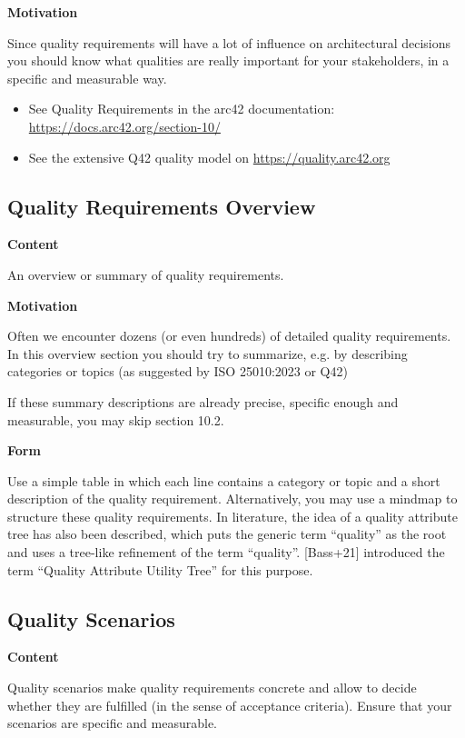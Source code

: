 \documentclass[12pt,a4paper]{article}
\newcommand{\minititle}[1]{%
  \par\addvspace{0.6\baselineskip}%
  \noindent\textbf{#1}\par\nobreak%
  \noindent\ignorespaces%
}
\begin{document}
\minititle{Motivation}
Since quality requirements will have a lot of influence on architectural decisions you should know what qualities are really important for your stakeholders, in a specific and measurable way.

\begin{itemize}
  \item See Quality Requirements in the arc42 documentation:
  \href{https://docs.arc42.org/section-10/}{https://docs.arc42.org/section-10/}
  \item See the extensive Q42 quality model on \href{https://quality.arc42.org/}{https://quality.arc42.org}
\end{itemize}


\subsection{Quality Requirements Overview}

\minititle{Content}
An overview or summary of quality requirements.

\minititle{Motivation}
Often we encounter dozens (or even hundreds) of detailed quality requirements. In this overview section you should try to summarize, e.g. by describing categories or topics (as suggested by ISO 25010:2023 or Q42)

If these summary descriptions are already precise, specific enough and measurable, you may skip section 10.2.

\minititle{Form}
Use a simple table in which each line contains a category or topic and a short description of the quality requirement. Alternatively, you may use a mindmap to structure these quality requirements. In literature, the idea of a quality attribute tree has also been described, which puts the generic term ``quality'' as the root and uses a tree-like refinement of the term ``quality''. [Bass+21] introduced the term ``Quality Attribute Utility Tree'' for this purpose.

\subsection{Quality Scenarios}

\minititle{Content}
Quality scenarios make quality requirements concrete and allow to decide whether they are fulfilled (in the sense of acceptance criteria). Ensure that your scenarios are specific and measurable.
\end{document}
